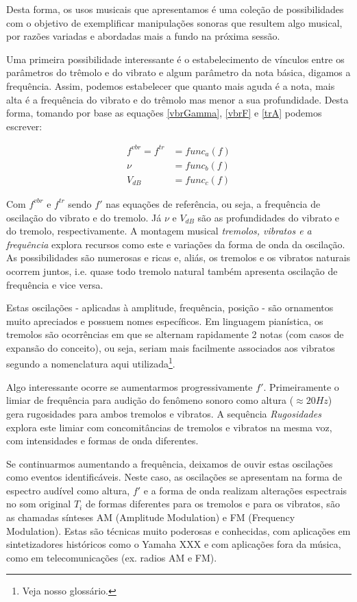 Desta forma, os usos musicais que apresentamos é uma coleção de possibilidades
com o objetivo de exemplificar manipulações sonoras que resultem algo
musical, por razões variadas e abordadas mais a fundo na próxima sessão.

Uma primeira possibilidade interessante é o estabelecimento de vínculos
entre os parâmetros do trêmolo e do vibrato e algum parâmetro da nota básica,
digamos a frequência. Assim, podemos estabelecer que quanto mais aguda é a nota,
mais alta é a frequência do vibrato e do trêmolo mas menor a sua profundidade.
Desta forma, tomando por base as equações \ref{vbrGamma}, \ref{vbrF} e \ref{trA}
podemos escrever:

\begin{equation}
\begin{split}
f^{vbr} = f^{tr} & = func_a(f) \\
\nu & = func_b(f) \\
V_{dB} & = func_c(f)
\end{split}
\end{equation}

Com $f^{vbr}$ e $f^{tr}$ sendo $f'$ nas equações de referência, ou seja, a frequência
de oscilação do vibrato e do tremolo. Já $\nu$ e $V_{dB}$ são as profundidades
do vibrato e do tremolo, respectivamente. A montagem musical 
\emph{tremolos, vibratos e a frequência} explora
recursos como este e variações da forma de onda da oscilação. As possibilidades
são numerosas e ricas e, aliás, os tremolos e os vibratos naturais ocorrem
juntos, i.e. quase todo tremolo natural também apresenta oscilação de frequência
e vice versa.

Estas oscilações - aplicadas à amplitude, frequência, posição - são ornamentos muito apreciados e possuem nomes
específicos. Em linguagem pianística,
os tremolos são ocorrências em que se alternam rapidamente 2 notas (com
casos de expansão do conceito), ou seja, seriam mais facilmente associados aos vibratos
segundo a nomenclatura aqui utilizada\footnote{Veja nosso glossário.}.

Algo interessante ocorre se aumentarmos progressivamente $f'$.
Primeiramente o limiar de frequência
para audição do fenômeno sonoro como
altura ($\approx 20Hz$) gera rugosidades para
ambos tremolos e vibratos. A sequência \emph{Rugosidades}
explora este limiar com concomitâncias de tremolos e vibratos na mesma
voz, com intensidades e formas de onda diferentes.

Se continuarmos aumentando a frequência, deixamos de ouvir estas oscilações
como eventos identificáveis. Neste caso, as oscilações se apresentam na forma de espectro
audível como altura, $f'$ e a forma de onda realizam alterações espectrais no som
original $T_i$ de formas diferentes para os tremolos e para os vibratos, são as 
chamadas sínteses AM (Amplitude Modulation) e FM (Frequency Modulation).
Estas são técnicas muito poderosas e conhecidas, com aplicações em sintetizadores
históricos como o Yamaha XXX e com aplicações fora da música, como em telecomunicações
(ex. radios AM e FM).

